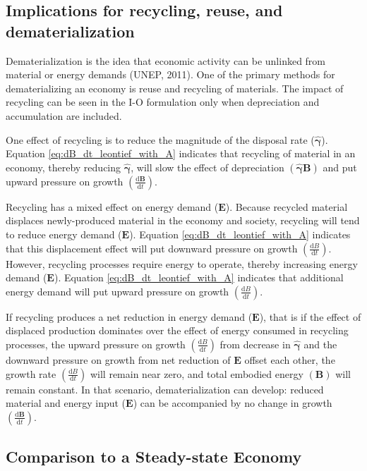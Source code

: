 \documentclass[authoryear,preprint,review,12pt]{elsarticle}
\let\oldhat\hat
\renewcommand{\vec}[1]{\mathbf{#1}}
\renewcommand{\hat}[1]{\oldhat{\mathbf{#1}}}
\begin{document}
\subsection{Implications for recycling, reuse, and dematerialization}

Dematerialization is the idea that economic activity can be unlinked from material or energy demands (UNEP, 2011). One of the primary methods for dematerializing an economy is reuse and recycling of materials. The impact of recycling can be seen in the I-O formulation only when depreciation and accumulation are included. 

One effect of recycling is to reduce the magnitude of the disposal rate ($\hat{\vec{\gamma}}$). Equation \ref{eq:dB_dt_leontief_with_A} indicates that recycling of material in an economy, thereby reducing $\hat{\vec{\gamma}}$, will slow the effect of depreciation $\left(\hat{\vec{\gamma}}\vec{B}\right)$ and put upward pressure on growth $\left(\frac{\mathrm{d}\vec{B}}{\mathrm{d}t}\right)$. 

Recycling has a mixed effect on energy demand ($\vec{E}$). Because recycled material displaces newly-produced material in the economy and society, recycling will tend to reduce energy demand ($\vec{E}$). Equation \ref{eq:dB_dt_leontief_with_A} indicates that this displacement effect will put downward pressure on growth $\left(\frac{\mathrm{d}B}{\mathrm{d}t}\right)$. However, recycling processes require energy to operate, thereby increasing energy demand ($\vec{E}$). Equation \ref{eq:dB_dt_leontief_with_A} indicates that additional energy demand will put upward pressure on growth $\left(\frac{\mathrm{d}B}{\mathrm{d}t}\right)$. 

If recycling produces a net reduction in energy demand ($\vec{E}$), that is if the effect of displaced production dominates over the effect of energy consumed in recycling processes, the upward pressure on growth $\left(\frac{\mathrm{d}B}{\mathrm{d}t}\right)$ from decrease in $\hat{\vec{\gamma}}$ and the downward pressure on growth from net reduction of $\vec{E}$ offset each other, the growth rate $\left(\frac{\mathrm{d}B}{\mathrm{d}t}\right)$ will remain near zero, and total embodied energy $(\vec{B})$ will remain constant. In that scenario, dematerialization can develop: reduced material and energy input ($\vec{E}$) can be accompanied by no change in growth $\left(\frac{\mathrm{d}\vec{B}}{\mathrm{d}t}\right)$.


\subsection{Comparison to a Steady-state Economy}
\end{document}
